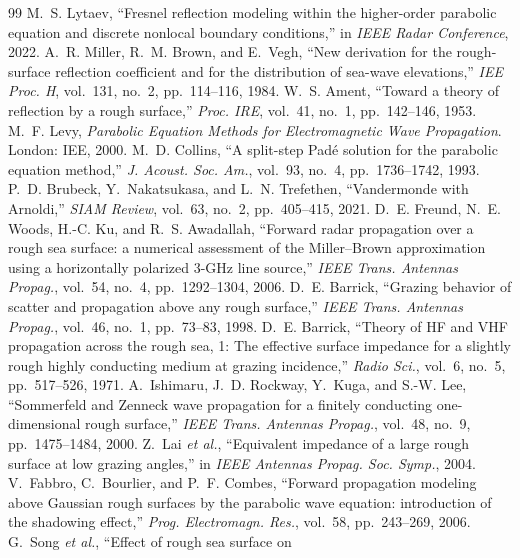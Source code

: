 \documentclass[11pt,a4paper]{article}
\begin{document}
\begin{thebibliography}{99}
 M.~S. Lytaev, ``Fresnel reflection modeling within the
  higher-order parabolic equation and discrete nonlocal boundary conditions,''
  in \emph{IEEE Radar Conference}, 2022.
 A.~R. Miller, R.~M. Brown, and E.~Vegh, ``New derivation for the
  rough-surface reflection coefficient and for the distribution of sea-wave
  elevations,'' \emph{IEE Proc. H}, vol.~131, no.~2, pp.~114--116, 1984.
 W.~S. Ament, ``Toward a theory of reflection by a rough
  surface,'' \emph{Proc. IRE}, vol.~41, no.~1, pp.~142--146, 1953.
 M.~F. Levy, \emph{Parabolic Equation Methods for Electromagnetic
  Wave Propagation}. London: IEE, 2000.
 M.~D. Collins, ``A split-step Pad\'e solution for the parabolic
  equation method,'' \emph{J. Acoust. Soc. Am.}, vol.~93, no.~4, pp.~1736--1742, 1993.
 P.~D. Brubeck, Y.~Nakatsukasa, and L.~N. Trefethen,
  ``Vandermonde with Arnoldi,'' \emph{SIAM Review}, vol.~63, no.~2, pp.~405--415, 2021.
 D.~E. Freund, N.~E. Woods, H.-C. Ku, and R.~S. Awadallah,
  ``Forward radar propagation over a rough sea surface: a numerical assessment of
  the Miller--Brown approximation using a horizontally polarized 3-GHz line
  source,'' \emph{IEEE Trans. Antennas Propag.}, vol.~54, no.~4, pp.~1292--1304, 2006.
 D.~E. Barrick, ``Grazing behavior of scatter and propagation
  above any rough surface,'' \emph{IEEE Trans. Antennas Propag.}, vol.~46, no.~1,
  pp.~73--83, 1998.
 D.~E. Barrick, ``Theory of HF and VHF propagation across the
  rough sea, 1: The effective surface impedance for a slightly rough highly
  conducting medium at grazing incidence,'' \emph{Radio Sci.}, vol.~6, no.~5,
  pp.~517--526, 1971.
 A.~Ishimaru, J.~D. Rockway, Y.~Kuga, and S.-W. Lee,
  ``Sommerfeld and Zenneck wave propagation for a finitely conducting
  one-dimensional rough surface,'' \emph{IEEE Trans. Antennas Propag.}, vol.~48,
  no.~9, pp.~1475--1484, 2000.
 Z.~Lai \emph{et al.}, ``Equivalent impedance of a large rough
  surface at low grazing angles,'' in \emph{IEEE Antennas Propag. Soc. Symp.}, 2004.
 V.~Fabbro, C.~Bourlier, and P.~F. Combes, ``Forward propagation
  modeling above Gaussian rough surfaces by the parabolic wave equation:
  introduction of the shadowing effect,'' \emph{Prog. Electromagn. Res.}, vol.~58,
  pp.~243--269, 2006.
 G.~Song \emph{et al.}, ``Effect of rough sea surface on

\end{thebibliography}
\end{document}
